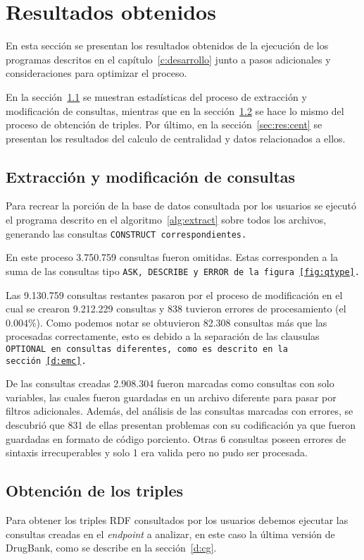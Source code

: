 
\section{Resultados obtenidos}\label{sec:res}
En esta sección se presentan los resultados obtenidos de la ejecución de los
programas descritos en el capítulo~\ref{c:desarrollo} junto a pasos 
adicionales y consideraciones para optimizar el proceso.

En la sección~\ref{sec:res:extr} se muestran estadísticas del proceso de
extracción y modificación de consultas, mientras que en la
sección~\ref{sec:res:obt} se hace lo mismo del proceso de obtención de triples.
Por último, en la sección~\ref{sec:res:cent} se presentan los resultados del
calculo de centralidad y datos relacionados a ellos.

\subsection{Extracción y modificación de consultas}\label{sec:res:extr}
Para recrear la porción de la base de datos consultada por los usuarios se
ejecutó el programa descrito en el algoritmo~\ref{alg:extract} sobre todos los
archivos, generando las consultas \tt{CONSTRUCT} correspondientes.

En este proceso 3.750.759 consultas fueron omitidas. Estas corresponden a la
suma de las consultas tipo \tt{ASK}, \tt{DESCRIBE} y \tt{ERROR} de la
figura~\ref{fig:qtype}.

Las 9.130.759 consultas restantes pasaron por el proceso de modificación en el
cual se crearon 9.212.229 consultas y 838 tuvieron errores de procesamiento
(el $0.004\%$).
Como podemos notar se obtuvieron 82.308 consultas más que las procesadas
correctamente, esto es debido a la separación de las clausulas \tt{OPTIONAL} en
consultas diferentes, como es descrito en la sección~\ref{d:emc}.

De las consultas creadas 2.908.304 fueron marcadas como consultas con solo
variables, las cuales fueron guardadas en un archivo diferente para pasar por
filtros adicionales. 
Además, del análisis de las consultas marcadas con errores, se descubrió que
831 de ellas presentan problemas con su codificación ya que fueron guardadas en
formato de código porciento. Otras 6 consultas poseen errores de sintaxis
irrecuperables y solo 1 era valida pero no pudo ser procesada.

\subsection{Obtención de los triples}\label{sec:res:obt}
Para obtener los triples RDF consultados por los usuarios debemos ejecutar las
consultas creadas en el \emph{endpoint} a analizar, en este caso la última
versión de DrugBank, como se describe en la sección~\ref{d:cg}.

